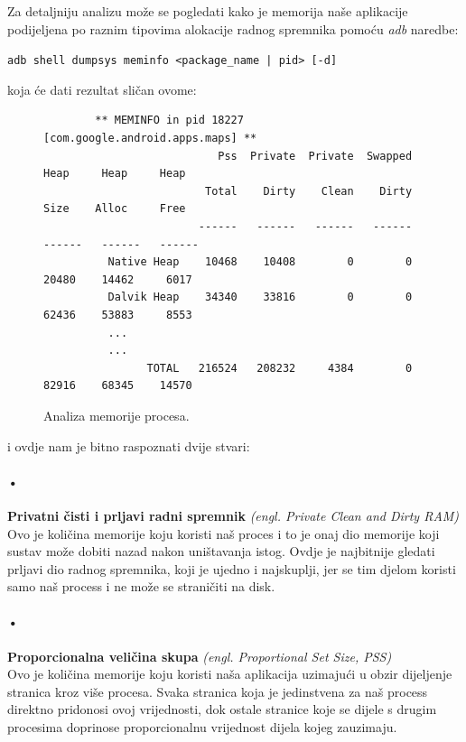 \documentclass[times, utf8, zavrsni]{fer}
\begin{document}
Za detaljniju analizu može se pogledati kako je memorija naše aplikacije podijeljena po raznim tipovima alokacije radnog spremnika pomoću \textit{adb} naredbe:

\begin{center}
\verb=adb shell dumpsys meminfo <package_name | pid> [-d]=
\end{center}
koja će dati rezultat sličan ovome:

\begin{figure}[ht!]
\centering
\begingroup
    \fontsize{9pt}{12pt}\selectfont
		\begin{verbatim}
		** MEMINFO in pid 18227 [com.google.android.apps.maps] **
		                   Pss  Private  Private  Swapped     Heap     Heap     Heap
		                 Total    Dirty    Clean    Dirty     Size    Alloc     Free
		                ------   ------   ------   ------   ------   ------   ------
		  Native Heap    10468    10408        0        0    20480    14462     6017
		  Dalvik Heap    34340    33816        0        0    62436    53883     8553
		  ...
		  ...
		        TOTAL   216524   208232     4384        0    82916    68345    14570
\end{verbatim}
\endgroup
\caption{Analiza memorije procesa.}
\label{overflow}
\end{figure}

\noindent
i ovdje nam je bitno raspoznati dvije stvari:


\paragraph{•}
\textbf{Privatni čisti i prljavi radni spremnik} \textit{(engl. Private Clean and Dirty RAM)}\\
Ovo je količina memorije koju koristi naš proces i to je onaj dio memorije koji sustav može dobiti nazad nakon uništavanja istog. Ovdje je najbitnije gledati prljavi dio radnog spremnika, koji je ujedno i najskuplji, jer se tim djelom koristi samo naš process i ne može se straničiti na disk.

\paragraph{•}
\textbf{Proporcionalna veličina skupa} \textit{(engl. Proportional Set Size, PSS)}\\
Ovo je količina memorije koju koristi naša aplikacija uzimajući u obzir dijeljenje stranica kroz više procesa. Svaka stranica koja je jedinstvena za naš process direktno pridonosi ovoj vrijednosti, dok ostale stranice koje se dijele s drugim procesima doprinose proporcionalnu vrijednost dijela kojeg zauzimaju.
\end{document}
